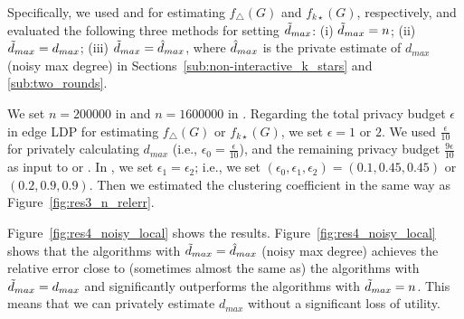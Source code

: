 Specifically, we used  and  for estimating $f_\triangle(G)$ and $f_{k\star}(G)$, respectively, and evaluated the following three methods for setting $\tilde{d}_{max}$: 
(i) 
$\tilde{d}_{max} = n$; 
(ii) 
$\tilde{d}_{max} = d_{max}$; 
(iii) 
$\tilde{d}_{max} = \hat{d}_{max}$, where $\hat{d}_{max}$ is the private estimate of $d_{max}$ 
(noisy max degree) in Sections~\ref{sub:non-interactive_k_stars} and \ref{sub:two_rounds}. 

We set $n=200000$ in \IMDB{} and $n=1600000$ in \Orkut{}. 
Regarding the total privacy budget $\epsilon$ in edge LDP for estimating $f_\triangle(G)$ or $f_{k\star}(G)$, we set $\epsilon=1$ or $2$. 
We used $\frac{\epsilon}{10}$ for privately calculating $d_{max}$ (i.e., $\epsilon_0 = \frac{\epsilon}{10}$), and the remaining privacy budget $\frac{9\epsilon}{10}$ as input to  or . 
In , we set $\epsilon_1 = \epsilon_2$; i.e., we set $(\epsilon_0, \epsilon_1, \epsilon_2) = (0.1, 0.45, 0.45)$ or $(0.2, 0.9, 0.9)$. 
Then we estimated the clustering coefficient in the same way as Figure~\ref{fig:res3_n_relerr}. 

Figure~\ref{fig:res4_noisy_local} shows the results. 
Figure~\ref{fig:res4_noisy_local} shows that 
the algorithms with $\tilde{d}_{max} = \hat{d}_{max}$ (noisy max degree) 
achieves the relative error close to (sometimes almost the same as) 
the algorithms with $\tilde{d}_{max} = d_{max}$ 
and significantly outperforms 
the algorithms with $\tilde{d}_{max} = n$. 
This means that we can privately estimate $d_{max}$ without a significant loss of utility. 


